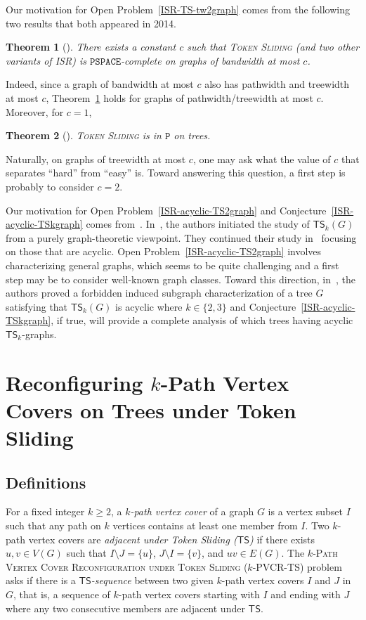 \documentclass[a4paper]{article}
\newtheorem{theorem}{Theorem}
\theoremstyle{definition}
\theoremstyle{remark}
\numberwithin{equation}{section}
\begin{document}
Our motivation for Open Problem~\ref{ISR-TS-tw2graph} comes from the following two results that both appeared in 2014.
\begin{theorem}[\cite{journals/jcss/Wrochna18}]\label{thm:ISR-bounded-bw}
	There exists a constant $c$ such that \textsc{Token Sliding} (and two other variants of \textsc{ISR}) is $\mathtt{PSPACE}$-complete on graphs of bandwidth at most $c$.
\end{theorem}
Indeed, since a graph of bandwidth at most $c$ also has pathwidth and treewidth at most $c$, Theorem~\ref{thm:ISR-bounded-bw} holds for graphs of pathwidth/treewidth at most $c$. 
Moreover, for $c = 1$, 
\begin{theorem}[\cite{journals/tcs/DemaineDFHIOOUY15}]\label{thm:ISR-TS-trees}
	\textsc{Token Sliding} is in $\mathtt{P}$ on trees.
\end{theorem}
Naturally, on graphs of treewidth at most $c$, one may ask what the value of $c$ that separates ``hard'' from ``easy'' is.
Toward answering this question, a first step is probably to consider $c = 2$.

Our motivation for Open Problem~\ref{ISR-acyclic-TS2graph} and Conjecture~\ref{ISR-acyclic-TSkgraph} comes from~\cite{journals/corr/AvisH22,journals/corr/AvisH23}. 
In~\cite{journals/corr/AvisH22}, the authors initiated the study of $\mathsf{TS}_k(G)$ from a purely graph-theoretic viewpoint.
They continued their study in~\cite{journals/corr/AvisH23} focusing on those that are acyclic.
Open Problem~\ref{ISR-acyclic-TS2graph} involves characterizing general graphs, which seems to be quite challenging and a first step may be to consider well-known graph classes.
Toward this direction, in~\cite{journals/corr/AvisH23}, the authors proved a forbidden induced subgraph characterization of a tree $G$ satisfying that $\mathsf{TS}_k(G)$ is acyclic where $k \in \{2,3\}$ and Conjecture~\ref{ISR-acyclic-TSkgraph}, if true, will provide a complete analysis of which trees having acyclic $\mathsf{TS}_k$-graphs.

\section{Reconfiguring $k$-Path Vertex Covers on Trees under Token Sliding}

\subsection{Definitions}

For a fixed integer $k \geq 2$, a \textit{$k$-path vertex cover} of a graph $G$ is a vertex subset $I$ such that any path on $k$ vertices contains at least one member from $I$.
Two $k$-path vertex covers are \textit{adjacent under Token Sliding ($\mathsf{TS}$)} if there exists $u, v \in V(G)$ such that $I \setminus J = \{u\}$, $J \setminus I = \{v\}$, and $uv \in E(G)$.
The \textsc{$k$-Path Vertex Cover Reconfiguration under Token Sliding ($k$-PVCR-TS)} problem asks if there is a \textit{$\mathsf{TS}$-sequence} between two given $k$-path vertex covers $I$ and $J$ in $G$, that is, a sequence of $k$-path vertex covers starting with $I$ and ending with $J$ where any two consecutive members are adjacent under $\mathsf{TS}$.
\end{document}
